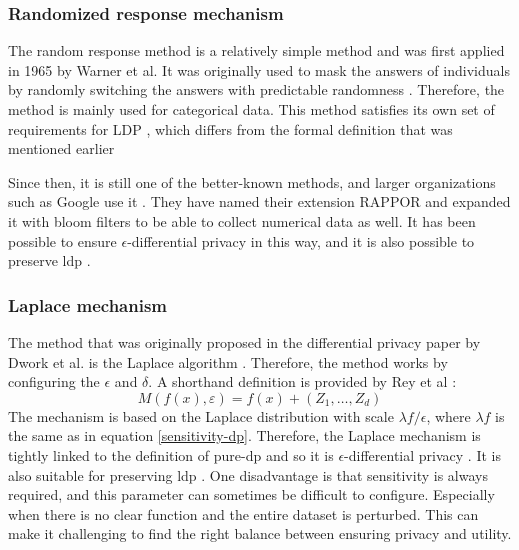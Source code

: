 \subsubsection{Randomized response mechanism}
The random response method is a relatively simple method and was first applied in 1965 by Warner et al.
It was originally used to mask the answers of individuals by randomly switching the answers with predictable randomness \citep{warner_randomized_1965-1}.
Therefore, the method is mainly used for categorical data.
This method satisfies its own set of requirements for LDP \citep{del_rey_comprehensive_2020-1}, which differs from the formal definition that was mentioned earlier

Since then, it is still one of the better-known methods, and larger organizations such as Google use it \citep{erlingsson_rappor_2014-2}.
They have named their extension RAPPOR and expanded it with bloom filters to be able to collect numerical data as well.
It has been possible to ensure $\epsilon$-differential privacy in this way, and it is also possible to preserve \gls{ldp} \citep{del_rey_comprehensive_2020-1}.
\subsubsection{Laplace mechanism} \label{laplace}
The method that was originally proposed in the differential privacy paper by Dwork et al. is the Laplace algorithm \citep{dwork_differential_2006}.
Therefore, the method works by configuring the $\epsilon$ and $\delta$. A shorthand definition is provided by Rey et al \citep{del_rey_comprehensive_2020-1}:
\begin{equation}
  M\left(f\left(x\right),\varepsilon\right)=f\left(x\right)+\left(Z_{1},\ldots,Z_{d}\right)
\end{equation}
The mechanism is based on the Laplace distribution with scale $\lambda f/\epsilon$, where $\lambda f$ is the same as in equation \ref{sensitivity-dp}.
Therefore, the Laplace mechanism is tightly linked to the definition of pure-dp and so it is $\epsilon$-differential privacy \citep{dwork_differential_2006}.
It is also suitable for preserving \gls{ldp} \citep{del_rey_comprehensive_2020-1}.
One disadvantage is that sensitivity is always required, and this parameter can sometimes be difficult to configure.
Especially when there is no clear function and the entire dataset is perturbed.
This can make it challenging to find the right balance between ensuring privacy and utility.

